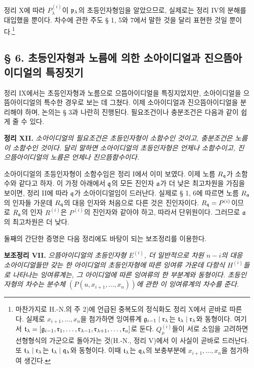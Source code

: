 정리 X에 따라 \(P_\lambda^{(i)}\)이 \(\mathfrak p_\lambda\)의 초등인자형임을 알았으므로, 실제로는 정리 IV의 분해를 대입했을 뿐이다. 차수에 관한 주도 § 1, 5와 7에서 말한 것을 달리 표현한 것일 뿐이다.\footnote{마찬가지로 H.-N.의 주 2)에 언급된 중복도의 정식화도 정리 X에서 곧바로 따른다. 실제로 \(x_{i+1},\ldots,x_n\)을 첨가하면 잉여류계 \(\mathfrak g_{i-1}\mid\mathfrak r_\lambda\)는 \(\mathfrak t_\lambda\mid\mathfrak r_\lambda\)와 동형이다. 여기서 \(\mathfrak t_\lambda=[\mathfrak g_{i-1},\mathfrak r_1,\ldots,\mathfrak r_{\lambda-1},\mathfrak r_{\lambda+1},\ldots,\mathfrak r_a]\)로 둔다. \(Q_\mu^{(i)}\)들이 서로 소임을 고려하면 선형형식의 가군으로 돌아가는 것(H.-N., 정리 V)에서 이 사실이 곧바로 드러난다. 또 \(\mathfrak t_\lambda\mid\mathfrak r_\lambda\)는 \(\mathfrak t_\lambda\mid\mathfrak q_\lambda\)와 동형이다. 이때 \(\mathfrak t_\lambda\)는 \(\mathfrak q_\lambda\)의 보충부분에 \(x_{i+1},\ldots,x_n\)을 첨가하여 생긴다.}

\subsection*{§ 6. 초등인자형과 노름에 의한 소아이디얼과 진으뜸아이디얼의 특징짓기}

정리 IX에서는 초등인자형과 노름으로 으뜸아이디얼을 특징지었지만, 소아이디얼을 으뜸아이디얼의 특수한 경우로 보는 데 그쳤다. 이제 소아이디얼과 진으뜸아이디얼을 분리해야 하며, 논의는 § 3과 나란히 진행된다. 필요조건이나 충분조건은 다음과 같이 쉽게 줄 수 있다.

\textbf{정리 XII.} \emph{소아이디얼의 필요조건은 초등인자형이 소함수인 것이고, 충분조건은 노름이 소함수인 것이다. 달리 말하면 소아이디얼의 초등인자형은 언제나 소함수이고, 진으뜸아이디얼의 노름은 언제나 진으뜸함수이다.}

소아이디얼의 초등인자형이 소함수임은 정리 I에서 이미 보였다. 이제 노름 \(R_\mathfrak q\)가 소함수와 같다고 하자. 이 가정 아래에서 \(\mathfrak q\)의 모든 진인자 \(\mathfrak a\)가 더 낮은 최고차원을 가짐을 보이면, 정리 II에 따라 \(\mathfrak q\)가 소아이디얼임이 드러난다. 실제로 § 1, 6에 따르면 노름 \(R_\mathfrak a\)의 인자들 가운데 \(R_\mathfrak q\)의 대응 인자와 처음으로 다른 것은 진인자이다. \(R_\mathfrak q=P^{(i)}\)이므로 \(R_\mathfrak a\)의 인자 \(R^{(i)}\)은 \(P^{(i)}\)의 진인자와 같아야 하고, 따라서 단위원이다. 그러므로 \(\mathfrak a\)의 최고차원은 더 낮다.

둘째의 간단한 증명은 다음 정리에도 바탕이 되는 보조정리를 이용한다.

\textbf{보조정리 VII.} \emph{으뜸아이디얼의 초등인자형 \(E^{(i)}\), 더 일반적으로 차원 \(n-i\)의 대응 소아이디얼들만 갖는 한 아이디얼의 초등인자형에 따른 잉여류 가운데 다항식 \(H^{(i)}\)들로 나타나는 잉여류계는, 그 아이디얼에 따른 잉여류의 한 부분계와 동형이다. 초등인자형의 차수는 분수체 \((P(u,x_{i+1},\ldots,x_n))\)에 관한 이 잉여류계의 차수를 준다.}

